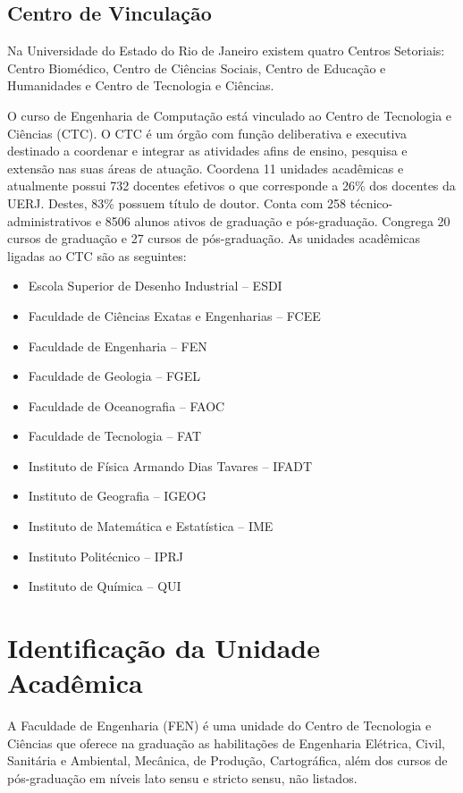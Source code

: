 \subsection{Centro de Vinculação}

Na Universidade do Estado do Rio de Janeiro existem quatro Centros Setoriais: Centro Biomédico, Centro de Ciências Sociais, Centro de Educação e Humanidades e Centro de Tecnologia e Ciências.

O curso de Engenharia de Computação está vinculado ao Centro de Tecnologia e Ciências (CTC).
O CTC é um órgão com função deliberativa e executiva destinado a coordenar e integrar as atividades afins de ensino, pesquisa e extensão nas suas áreas de atuação. Coordena 11 unidades acadêmicas e atualmente possui 732 docentes efetivos o que corresponde a 26\% dos docentes da UERJ. Destes, 83\% possuem título de doutor. Conta com 258 técnico-administrativos e 8506 alunos ativos de graduação e pós-graduação. Congrega 20 cursos de graduação e 27 cursos de pós-graduação. As unidades acadêmicas ligadas ao CTC são as seguintes:

\begin{itemize}

	\item Escola Superior de Desenho Industrial -- ESDI
	\item Faculdade de Ciências Exatas e Engenharias -- FCEE
	\item Faculdade de Engenharia -- FEN
	\item Faculdade de Geologia -- FGEL
	\item Faculdade de Oceanografia -- FAOC
	\item Faculdade de Tecnologia -- FAT
	\item Instituto de Física Armando Dias Tavares -- IFADT
	\item Instituto de Geografia -- IGEOG
	\item Instituto de Matemática e Estatística -- IME
	\item Instituto Politécnico -- IPRJ
	\item Instituto de Química -- QUI

\end{itemize}

\section{Identificação da Unidade Acadêmica}

A Faculdade de Engenharia (FEN) é uma unidade do Centro de Tecnologia e Ciências que oferece na graduação as habilitações de Engenharia Elétrica, Civil, Sanitária e Ambiental, Mecânica, de Produção, Cartográfica, além dos cursos de pós-graduação em níveis lato sensu e stricto sensu, não listados.

